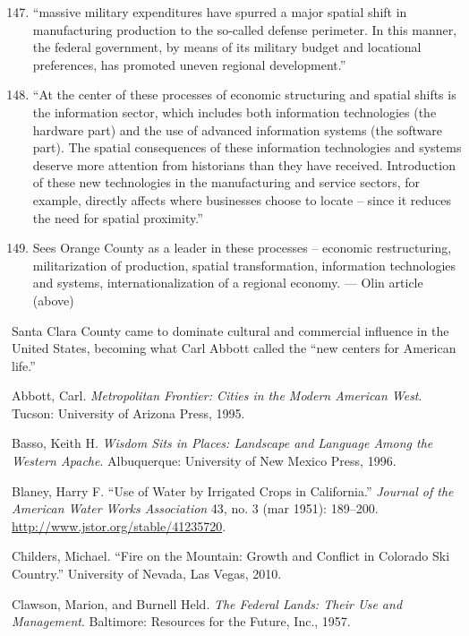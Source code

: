 \documentclass[11pt,article,oneside]{memoir}
\begin{document}
\begin{enumerate}[(1)]
\setcounter{enumi}{146}
\item
  ``massive military expenditures have spurred a major spatial shift in
  manufacturing production to the so-called defense perimeter. In this
  manner, the federal government, by means of its military budget and
  locational preferences, has promoted uneven regional development.''
\item
  ``At the center of these processes of economic structuring and spatial
  shifts is the information sector, which includes both information
  technologies (the hardware part) and the use of advanced information
  systems (the software part). The spatial consequences of these
  information technologies and systems deserve more attention from
  historians than they have received. Introduction of these new
  technologies in the manufacturing and service sectors, for example,
  directly affects where businesses choose to locate -- since it reduces
  the need for spatial proximity.''
\item
  Sees Orange County as a leader in these processes -- economic
  restructuring, militarization of production, spatial transformation,
  information technologies and systems, internationalization of a
  regional economy. --- Olin article (above)
\end{enumerate}

Santa Clara County came to dominate cultural and commercial influence in
the United States, becoming what Carl Abbott called the ``new centers
for American life.''

Abbott, Carl. \emph{Metropolitan Frontier: Cities in the Modern American
West}. Tucson: University of Arizona Press, 1995.

Basso, Keith H. \emph{Wisdom Sits in Places: Landscape and Language
Among the Western Apache}. Albuquerque: University of New Mexico Press,
1996.

Blaney, Harry F. ``Use of Water by Irrigated Crops in California.''
\emph{Journal of the American Water Works Association} 43, no. 3 (mar
1951): 189--200.
\href{http://www.jstor.org/stable/41235720}{http://www.jstor.org/stable/41235720}.

Childers, Michael. ``Fire on the Mountain: Growth and Conflict in
Colorado Ski Country.'' University of Nevada, Las Vegas, 2010.

Clawson, Marion, and Burnell Held. \emph{The Federal Lands: Their Use
and Management}. Baltimore: Resources for the Future, Inc., 1957.
\end{document}
